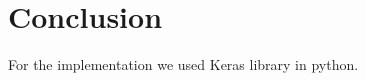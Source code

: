 \documentclass[8pt,conference,compsocconf]{IEEEtran}
\begin{document}
\section{Conclusion} \label{sec:conclusion}

For the implementation we used Keras library in python.



\end{document}
